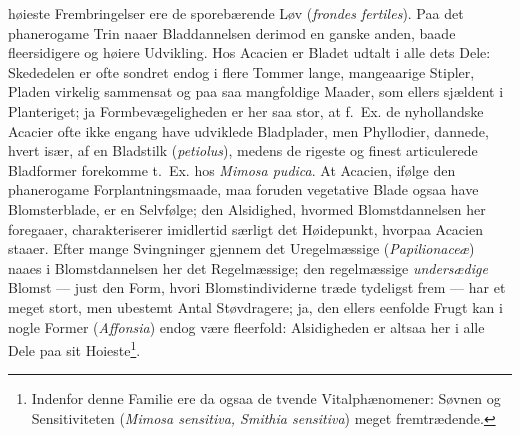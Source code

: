 \documentclass[11pt]{book}
\newcommand{\opage}[1]{\marginnote{\footnotesize\textit{[#1]}}}
\begin{document}
høieste Frembringelser ere de sporebærende Løv (\textit{frondes fertiles}).
Paa det phanerogame Trin naaer Bladdannelsen derimod en ganske anden, baade
fleersidigere og høiere Udvikling. Hos Acacien er Bladet udtalt i alle dets
Dele: Skededelen er ofte sondret endog i flere Tommer lange, mangeaarige
Stipler, Pladen virkelig sammensat og paa saa mangfoldige Maader, som ellers
sjældent i Planteriget; ja Formbevægeligheden er her saa stor, at f.~Ex. de
nyhollandske Acacier ofte ikke engang have udviklede Bladplader, men
Phyllodier, dannede, hvert især, af en Bladstilk (\textit{petiolus}), medens
de rigeste og finest articulerede Bladformer forekomme t.~Ex. hos
\textit{Mimosa pudica}. At Acacien, ifølge den phanerogame
Forplantningsmaade, maa foruden vegetative Blade ogsaa have Blomsterblade,
er en Selvfølge; den Alsidighed, hvormed Blomstdannelsen her foregaaer,
charakteriserer imidlertid særligt det Høidepunkt, hvorpaa Acacien staaer.
Efter mange Svingninger gjennem det Uregelmæssige
\opage{303} \setcounter{footnote}{0}%
(\textit{Papilionaceæ}) naaes i Blomstdannelsen her det Regelmæssige; den
regelmæssige \emph{undersædige} Blomst --- just den Form, hvori
Blomstindividerne træde tydeligst frem --- har et meget stort, men ubestemt
Antal Støvdragere; ja, den ellers eenfolde Frugt kan i nogle Former
(\textit{Affonsia}) endog være fleerfold: Alsidigheden er altsaa her i alle
Dele paa sit Hoieste\footnote{Indenfor denne Familie ere da ogsaa de tvende
Vitalphænomener: Søvnen og Sensitiviteten (\textit{Mimosa sensitiva,
Smithia sensitiva}) meget fremtrædende.}.
\end{document}
